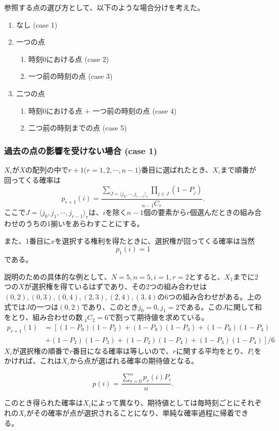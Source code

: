 参照する点の選び方として、以下のような場合分けを考えた。

\begin{enumerate}
    \item なし (case 1)
    \item 一つの点
    \begin{enumerate}
        \item 時刻0における点 (case 2)
        \item 一つ前の時刻の点 (case 3)
        \end{enumerate}
    \item 二つの点
    \begin{enumerate}
        \item 時刻0における点 + 一つ前の時刻の点 (case 4)
        \item 二つ前の時刻までの点 (case 5)
        \end{enumerate}
\end{enumerate}

\subsubsection{過去の点の影響を受けない場合 (case 1)}

$X_{i}$が$X$の配列の中で$r+1$($r = 1, 2, \cdots , n-1$)番目に選ばれたとき、$X_{i}$まで順番が回ってくる確率は
$$p_{r+1}(i) = \frac{\sum_{J = \langle j_{0}, \cdots ,j_{r-1} \rangle _{r}}\prod_{j\in J}(1-P_{j})}{_{n-1}C_{r}}.$$
ここで$J = \langle j_{0}, j_{1}, \cdots ,j_{r-1} \rangle_{r}$は、$i$を除く$n-1$個の要素から$r$個選んだときの組み合わせのうちの1揃いをあらわすことにする。

また、1番目に$x$を選択する権利を得たときに、選択権が回ってくる確率は当然
$$p_{1}(i) = 1$$
である。

説明のための具体的な例として、$N = 5, n = 5, i = 1, r = 2$とすると、$X_{1}$までに2つの$X$が選択権を得ているはずであり、その2つの組み合わせは$(0,2), (0,3), (0,4), (2,3), (2,4), (3,4)$の6つの組み合わせがある。上の式では$J$の一つは$(0, 2)$であり、このとき$j_{0} = 0, j_{1} = 2$である。この$J$に関して和をとり、組み合わせの数$\ _{4}C_{2} = 6$で割って期待値を求めている。
\begin{align}
p_{r+1}(1) &= \left[(1-P_{0})(1-P_{2}) + (1-P_{0})(1-P_{3}) + (1-P_{0})(1-P_{4}) \right. \nonumber \\
&\ \left. + (1-P_{2})(1-P_{3}) + (1-P_{2})(1-P_{4}) + (1-P_{3})(1-P_{4}) \right]/6
\end{align}
$X_{i}$が選択権の順番で$r$番目になる確率は等しいので、$r$に関する平均をとり、$P_{i}$をかければ、これは$X_{i}$から点が選ばれる確率の期待値となる。

$$p(i) = \frac{\sum_{r=0}^{n}p_{r}(i)P_{i}}{n}.$$

このとき得られた確率は$X_{i}$によって異なり、期待値としては毎時刻ごとにそれぞれの$X_{i}$がその確率が点が選択されることになり、単純な確率過程に帰着できる。

